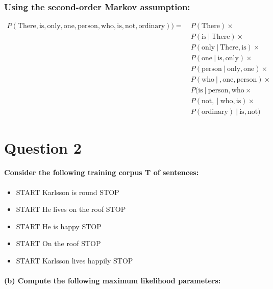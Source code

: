 \documentclass{article}
\newcommand\given[1][]{\:#1\vert\:}
\begin{document}
\subsubsection*{Using the second-order Markov assumption:}

\begin{equation*}
    \begin{split}
    P(\text{There}, \text{is}, \text{only}, \text{one}, \text{person}, \text{who}, \text{is}, \text{not}, \text{ordinary})) =\ & P(\text{There}) \times \\
    & P(\text{is} \given \text{There}) \times \\
    & P(\text{only} \given \text{There}, \text{is} ) \times \\
    & P(\text{one} \given \text{is}, \text{only}) \times \\
    & P(\text{person} \given  \text{only}, \text{one}) \times \\
    & P(\text{who} \given , \text{one}, \text{person}) \times \\
    & P(\text{is} \given \text{person}, \text{who} \times \\
    & P(\text{not}, \given \text{who}, \text{is}) \times \\
    & P(\text{ordinary}) \given \text{is}, \text{not})
    \end{split}
\end{equation*}

\clearpage

\section*{Question 2}

\paragraph{Consider the following training corpus T of sentences:}

\begin{itemize}
    \item START Karlsson is round STOP
    \item START He lives on the roof STOP
    \item START He is happy STOP
    \item START On the roof STOP
    \item START Karlsson lives happily STOP
\end{itemize}

\paragraph{(b) Compute the following maximum likelihood parameters:}
\end{document}

